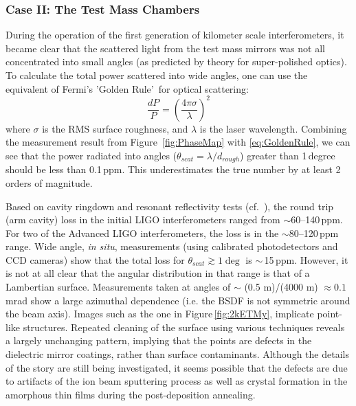 \subsubsection{Case II: The Test Mass Chambers}
During the operation of the first generation of kilometer scale interferometers,
it became clear that the scattered light from the test mass mirrors was not
all concentrated into small angles (as predicted by theory for super-polished
optics). To calculate the total power scattered into wide angles, one can use the
equivalent of Fermi's 'Golden Rule'\,\cite{Weiss:Scatter97} for optical scattering:
\begin{equation}
\frac{dP}{P} = \left( \frac{4 \pi \sigma}{\lambda} \right)^2
\label{eq:GoldenRule}
\end{equation}
where $\sigma$ is the RMS surface roughness, and $\lambda$ is the
laser wavelength. Combining the measurement result from
Figure~\ref{fig:PhaseMap} with \eqref{eq:GoldenRule}, we can see that the power radiated into
angles ($\theta_{scat} = \lambda / d_{rough}$) greater than 1\,degree should be
less than 0.1\,ppm. This underestimates the true number by
at least 2 orders of magnitude.

Based on cavity ringdown and resonant reflectivity tests (cf.~\cite{Isogai2013}),
the round trip (arm cavity) loss in the initial LIGO interferometers ranged from
$\sim$60--140\,ppm. For two of the Advanced LIGO interferometers, the loss
is in the $\sim$80--120\,ppm range. Wide angle, \textit{in situ},
measurements (using calibrated photodetectors and CCD cameras) show
that the total loss for $\theta_{scat} \gtrsim 1\deg$ is $\sim$\,15\,ppm.
However, it is not at all clear that the angular distribution in that
range is that of a Lambertian surface. Measurements taken at angles of
$\sim$ (0.5 m)/(4000 m) $\approx 0.1$\,mrad show a large azimuthal dependence
(i.e. the BSDF is not symmetric around the beam axis).
Images
such as the one in Figure\,\ref{fig:2kETMy}, implicate point-like structures.
Repeated cleaning of the surface using various techniques reveals a largely
unchanging pattern, implying that the points are defects in the dielectric
mirror coatings, rather than surface contaminants. Although the details of the
story are still being investigated, it seems possible that the defects
are due to artifacts of the ion beam sputtering process as well as
crystal formation in the amorphous thin films during the
post-deposition annealing.

